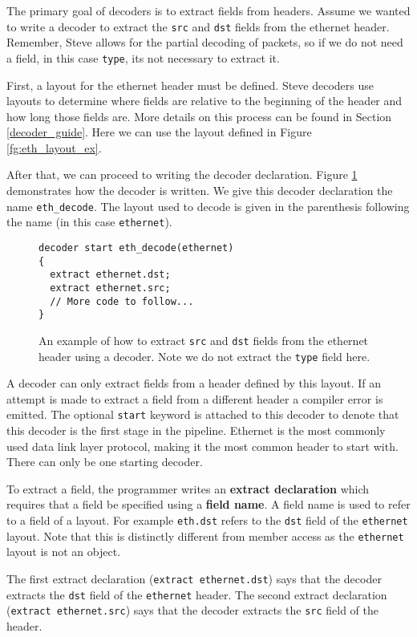 The primary goal of decoders is to extract fields from headers. Assume we wanted to write a decoder to extract the \texttt{src} and \texttt{dst} fields from the ethernet header. Remember, Steve allows for the partial decoding of packets, so if we do not need a field, in this case \texttt{type}, its not necessary to extract it. 

First, a layout for the ethernet header must be defined. Steve decoders use layouts to determine where fields are relative to the beginning of the header and how long those fields are. More details on this process can be found in Section \ref{decoder_guide}. Here we can use the layout defined in Figure \ref{fg:eth_layout_ex}. 

After that, we can proceed to writing the decoder declaration. Figure \ref{fg:extract_ex} demonstrates how the decoder is written. We give this decoder declaration the name \texttt{eth\_decode}. The layout used to decode is given in the parenthesis following the name (in this case \texttt{ethernet}).

\begin{figure}[ht]
\begin{lstlisting}
decoder start eth_decode(ethernet)
{
  extract ethernet.dst;
  extract ethernet.src;
  // More code to follow...
}
\end{lstlisting}
\caption{An example of how to extract \texttt{src} and \texttt{dst} fields from the ethernet header using a decoder. Note we do not extract the \texttt{type} field here.}
\label{fg:extract_ex}
\end{figure}

A decoder can only extract fields from a header defined by this layout. If an attempt is made to extract a field from a different header a compiler error is emitted. The optional \texttt{start} keyword is attached to this decoder to denote that this decoder is the first stage in the pipeline. Ethernet is the most commonly used data link layer protocol, making it the most common header to start with. There can only be one starting decoder.

To extract a field, the programmer writes an \textbf{extract declaration} which requires that a field be specified using a \textbf{field name}. A field name is used to refer to a field of a layout. For example \texttt{eth.dst} refers to the \texttt{dst} field of the \texttt{ethernet} layout.  Note that this is distinctly different from member access as the \texttt{ethernet} layout is not an object. 

The first extract declaration (\texttt{extract ethernet.dst}) says that the decoder extracts the \texttt{dst} field of the \texttt{ethernet} header. The second extract declaration (\texttt{extract ethernet.src}) says that the decoder extracts the \texttt{src} field of the  header. 

